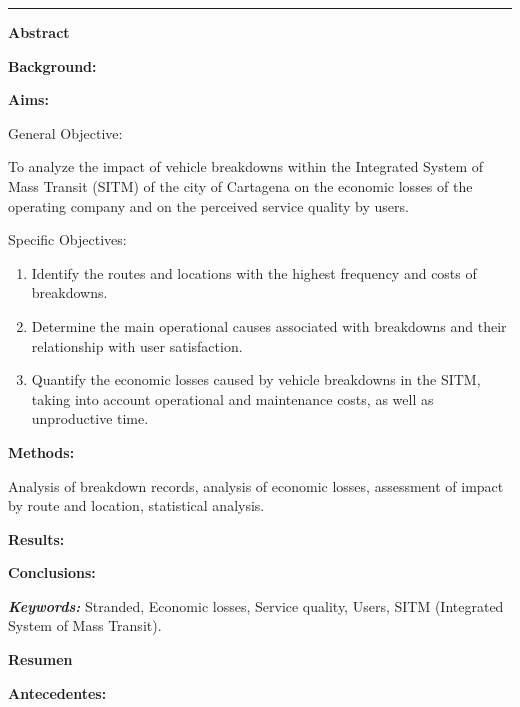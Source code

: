 \documentclass[
  letterpaper,
  DIV=11,
  numbers=noendperiod]{scrartcl}
\begin{document}
\begin{@twocolumnfalse}
\maketitle

\begin{center}\rule{12cm}{0.3mm} \end{center}

\begin{center}
\textbf{Abstract} 
\end{center}
 
\justify

\textbf{Background:}

\textbf{Aims:} 

General Objective:

To analyze the impact of vehicle breakdowns within the Integrated System of Mass Transit (SITM) of the city of Cartagena on the economic losses of the operating company and on the perceived service quality by users.

Specific Objectives:

\begin{enumerate} 
  \item Identify the routes and locations with the highest frequency and costs of breakdowns. 
  \item Determine the main operational causes associated with breakdowns and their relationship with user satisfaction.    \item Quantify the economic losses caused by vehicle breakdowns in the SITM, taking into account operational and maintenance costs, as well as unproductive time. 
\end{enumerate}

\textbf{Methods:}

Analysis of breakdown records, analysis of economic losses, assessment of impact by route and location, statistical analysis.

\textbf{Results:}

\textbf{Conclusions:}



\textbf{\textit{Keywords:}}
Stranded, Economic losses, Service quality, Users, SITM (Integrated System of Mass Transit).


\begin{center}
\textbf{Resumen} 
\end{center}

\justify


\textbf{Antecedentes:}


\end{@twocolumnfalse}
\end{document}
